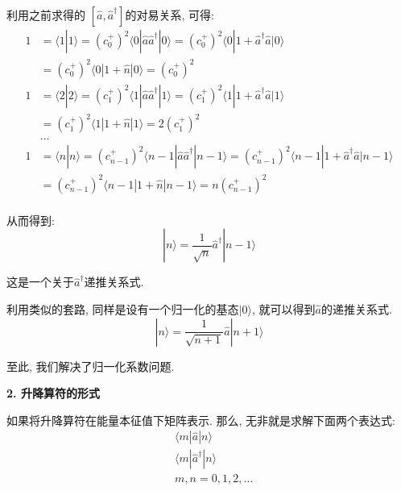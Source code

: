 \documentclass[a4paper, 11pt]{article}
\begin{document}
\begin{spacing}{1.2}
        利用之前求得的
        $[\hat{a}, \hat{a}^{\dagger}]$的对易关系, 可得:
        \begin{equation}
          \begin{aligned}
            1 &= \langle1|1\rangle = \left(c_0^+\right)^2\langle0|\hat{a}\hat{a}^{\dagger}|0\rangle%
            = \left(c_0^+\right)^2\langle0|1+\hat{a}^{\dagger}\hat{a}|0\rangle\\
            &= \left(c_0^+\right)^2\langle0|1+\hat{n}|0\rangle
            = \left(c_0^+\right)^2\\
            1 &= \langle2|2\rangle = \left(c_1^+\right)^2\langle1|\hat{a}\hat{a}^{\dagger}|1\rangle%
            = \left(c_1^+\right)^2\langle1|1+\hat{a}^{\dagger}\hat{a}|1\rangle\\
            &= \left(c_1^+\right)^2\langle1|1+\hat{n}|1\rangle
            = 2\left(c_1^+\right)^2\\
            &\ldots\\
            1 &= \langle{}n|n\rangle = \left(c_{n-1}^+\right)^2\langle{}n-1|\hat{a}\hat{a}^{\dagger}|n-1\rangle%
            = \left(c_{n-1}^+\right)^2\langle{}n-1|1+\hat{a}^{\dagger}\hat{a}|n-1\rangle\\
            &= \left(c_{n-1}^+\right)^2\langle{}n-1|1+\hat{n}|n-1\rangle
            = n\left(c_{n-1}^+\right)^2\\
          \end{aligned}
        \end{equation}

        从而得到:
        \begin{equation}
          \label{4316:dd1}
          |n\rangle = \dfrac{1}{\sqrt{n}}\hat{a}^{\dagger}|n-1\rangle
        \end{equation}

        这是一个关于$\hat{a}^{\dagger}$递推关系式.

        利用类似的套路, 同样是设有一个归一化的基态$|0\rangle$, 就可以得到$\hat{a}$的递推关系式.
        \begin{equation}
          \label{4316:dd2}
          |n\rangle = \dfrac{1}{\sqrt{n+1}}\hat{a}|n+1\rangle
        \end{equation}

        至此, 我们解决了归一化系数问题. 

        \textbf{2. 升降算符的形式}

        如果将升降算符在能量本征值下矩阵表示. 那么, 无非就是求解下面两个表达式:
        \begin{equation}
          \label{pxdsjf}
          \begin{aligned}
            &\langle{}m|\hat{a}|n\rangle \\
            &\langle{}m|\hat{a}^{\dagger}|n\rangle\\
            &m,n=0,1,2,\ldots 
          \end{aligned}
        \end{equation}


\end{spacing}
\end{document}
